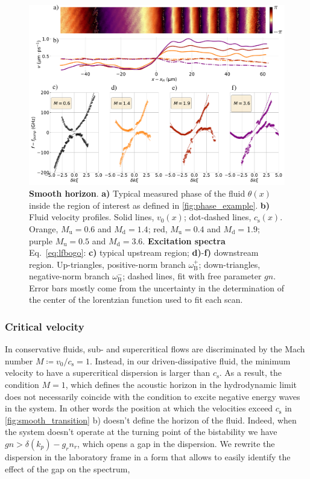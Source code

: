 \begin{figure}
    \centering
    \includegraphics[width=1\textwidth]{chap_custom_st/fig/bh_smooth.pdf}
    \caption{\textbf{Smooth horizon}.
    \textbf{a)} Typical measured phase of the fluid $\theta(x)$ inside the region of interest as defined in \autoref{fig:phase_example}.
    \textbf{b)} Fluid velocity profiles.
    Solid lines, $v_0(x)$; dot-dashed lines, $c_\mathrm{s}(x)$. Orange, $M_\mathrm{u}=0.6$ and $M_\mathrm{d}=1.4$; red, $M_\mathrm{u}=0.4$ and $M_\mathrm{d}=1.9$; purple $M_\mathrm{u}=0.5$ and $M_\mathrm{d}=3.6$.
    \textbf{Excitation spectra} Eq.~\eqref{eq:lfbogo}: \textbf{c)} typical upstream region; \textbf{d)}-\textbf{f)} downstream region.
    Up-triangles, positive-norm branch $\omega_\mathrm{B}^+$; down-triangles, negative-norm branch $\omega_\mathrm{B}^-$; dashed lines, fit with free parameter $gn$. Error bars mostly come from the uncertainty in the determination
    of the center of the lorentzian function used to fit each scan.
    \label{fig:smooth_transition}}
\end{figure}




\subsubsection{Critical velocity} In conservative fluids, sub- and supercritical flows are discriminated by the Mach number $M\coloneqq v_0/c_\mathrm{s}=1$.
Instead, in our driven-dissipative fluid, the minimum velocity to have a supercritical dispersion is larger than $c_\mathrm{s}$.
As a result, the condition $M=1$, which defines the acoustic horizon in the hydrodynamic limit does not necessarily coincide with the condition to excite negative energy waves in the system. In other words the position at 
which the velocities exceed $c_\mathrm{s}$ in \autoref{fig:smooth_transition} b) doesn't define the horizon of the fluid. Indeed, when the system doesn't operate at the turning
point of the bistability we have $gn>\delta(k_p)-g_rn_r$, which opens a gap in the dispersion. We rewrite the dispersion in the laboratory frame in a form that allows to easily identify the effect of the gap on the spectrum,


